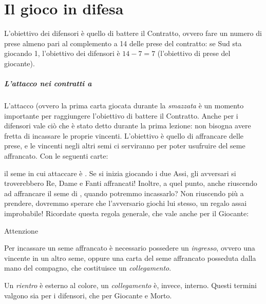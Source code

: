 \documentclass[../corsofiori.tex]{subfiles}
\begin{document}
\setcounter{chapter}{1}
\setcounter{regolactr}{2}
\chapter{Il gioco in difesa}

L'obiettivo dei difensori è quello di battere il Contratto, ovvero fare un numero di prese almeno pari al complemento a
14 delle prese del contratto: se Sud sta giocando 1\SA, l'obiettivo dei difensori è $14 - 7 = 7$ (l'obiettivo di prese del
giocante).

\paragraph{L'attacco nei contratti a \SA}

L'attacco (ovvero la prima carta giocata durante la \emph{smazzata} è un momento importante per raggiungere l'obiettivo di battere il
Contratto.
Anche per i difensori vale ciò che è stato detto durante la prima lezione: non bisogna avere fretta di incassare le
proprie vincenti. L'obiettivo è quello di affrancare delle prese, e le vincenti negli altri semi ci serviranno per poter
usufruire del seme affrancato. 
Con le seguenti carte:
\begin{center}
\end{center}
il seme in cui attaccare è \fio. Se si inizia giocando i due Assi, gli avversari si troverebbero Re, Dame e Fanti
affrancati! Inoltre, a quel punto, anche riuscendo ad affrancare il seme di \fio, quando potremmo incassarlo? Non
riuscendo più a prendere, dovremmo sperare che l'avversario giochi \fio lui stesso, un regalo assai improbabile! Ricordate questa regola generale, che vale anche per il Giocante:

\medskip
\begin{attenzione}{Attenzione}

    Per incassare un seme affrancato è necessario possedere un \emph{ingresso}, ovvero una vincente in un altro seme, oppure
    una carta del seme affrancato posseduta dalla mano del compagno, che costituisce un
    \emph{collegamento}.

\end{attenzione}

\medskip

Un \emph{rientro} è esterno al colore, un \emph{collegamento} è, invece, interno.
    Questi termini valgono sia per i difensori, che per Giocante e Morto.
\end{document}
